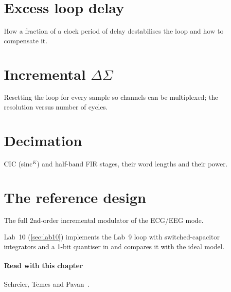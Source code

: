 \section{Excess loop delay}\label{sec:ch20-3}
How a fraction of a clock period of delay destabilises the loop and how to compensate it.

\section{Incremental \texorpdfstring{$\Delta\Sigma$}{Delta-Sigma}}\label{sec:ch20-4}
Resetting the loop for every sample so channels can be multiplexed; the resolution versus number of cycles.

\section{Decimation}\label{sec:ch20-5}
CIC (sinc$^K$) and half-band FIR stages, their word lengths and their power.

\section{The reference design}\label{sec:ch20-6}
The full 2nd-order incremental modulator of the \OB{} ECG/EEG mode.

\begin{tryit}
Lab~10 (\cref{sec:lab10}) implements the Lab~9 loop with switched-capacitor integrators and a 1-bit quantiser in \sgx{} and compares it with the ideal model.
\end{tryit}

\paragraph{Read with this chapter} Schreier, Temes and Pavan~\cite{schreier}.

